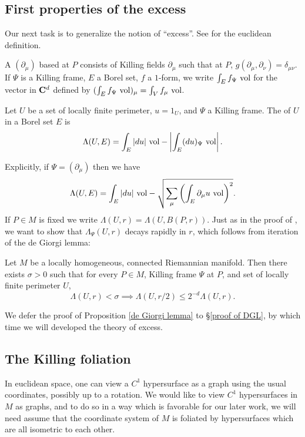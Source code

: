 
\subsection{First properties of the excess}
Our next task is to generalize the notion of ``excess''. See \cite[Chapter 6]{Giusti77} for the euclidean definition.

\begin{definition}
A  $(\partial_\mu)$ based at $P$ consists of Killing fields $\partial_\mu$ such that at $P$, $g(\partial_\mu, \partial_\nu) = \delta_{\mu\nu}$.
If $\Psi$ is a Killing frame, $E$ a Borel set, $f$ a $1$-form, we write $\int_E f_\Psi ~\mathrm{vol}$ for the vector in $\mathbf{C}^d$ defined by $(\int_E f_\Psi ~\mathrm{vol})_\mu = \int_V f_\mu ~\mathrm{vol}$.
\end{definition}

\begin{definition}
Let $U$ be a set of locally finite perimeter, $u = 1_U$, and $\Psi$ a Killing frame. The  of $U$ in a Borel set $E$ is 
$$\Lambda(U, E) = \int_E |du| ~\mathrm{vol} - \left|\int_E (du)_\Psi ~\mathrm{vol}\right|.$$
\end{definition}

Explicitly, if $\Psi = (\partial_\mu)$ then we have
$$\Lambda(U, E) = \int_E |du| ~\mathrm{vol} - \sqrt{\sum_\mu \left(\int_E \partial_\mu u ~\mathrm{vol}\right)^2}.$$
If $P \in M$ is fixed we write $\Lambda(U, r) = \Lambda(U, B(P, r))$.
Just as in the proof of \cite[Teorema 6.4]{Miranda66}, we want to show that $\Lambda_\Psi(U, r)$ decays rapidly in $r$, which follows from iteration of the de Giorgi lemma:

\begin{proposition}\label{de Giorgi lemma}
Let $M$ be a locally homogeneous, connected Riemannian manifold. Then there exists $\sigma > 0$ such that for every $P \in M$, Killing frame $\Psi$ at $P$, and set of locally finite perimeter $U$,
$$\Lambda(U, r) < \sigma \implies \Lambda(U, r/2) \leq 2^{-d} \Lambda(U, r).$$
\end{proposition}

We defer the proof of Proposition \ref{de Giorgi lemma} to \S\ref{proof of DGL}, by which time we will developed the theory of excess.



\subsection{The Killing foliation}
In euclidean space, one can view a $C^1$ hypersurface as a graph using the usual coordinates, possibly up to a rotation.
We would like to view $C^1$ hypersurfaces in $M$ as graphs, and to do so in a way which is favorable for our later work, we will need assume that the coordinate system of $M$ is foliated by hypersurfaces which are all isometric to each other.

